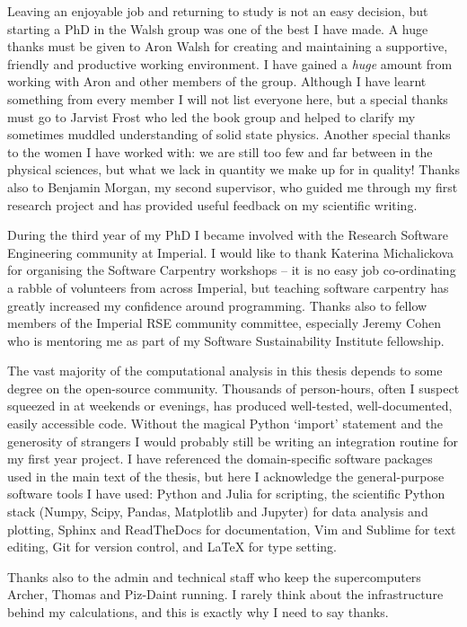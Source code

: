 Leaving an enjoyable job and returning to study is not an easy decision, but starting a PhD in the Walsh group was one of the best I have made. A huge thanks must be given to Aron Walsh for creating and maintaining a supportive, friendly and productive working environment. I have gained a \textit{huge} amount from working with Aron and other members of the group. Although I have learnt something from every member I will not list everyone here, but a special thanks must go to Jarvist Frost who led the book group and helped to clarify my sometimes muddled understanding of solid state physics. Another special thanks to the women I have worked with: we are still too few and far between in the physical sciences, but what we lack in quantity we make up for in quality! Thanks also to Benjamin Morgan, my second supervisor, who guided me through my first research project and has provided useful feedback on my scientific writing. 

During the third year of my PhD I became involved with the Research Software Engineering community at Imperial. I would like to thank Katerina Michalickova for organising the Software Carpentry workshops -- it is no easy job co-ordinating a rabble of volunteers from across Imperial, but teaching software carpentry has greatly increased my confidence around programming. Thanks also to fellow members of the Imperial RSE community committee, especially Jeremy Cohen who is mentoring me as part of my Software Sustainability Institute fellowship.

The vast majority of the computational analysis in this thesis depends to some degree on the open-source community. Thousands of person-hours, often I suspect squeezed in at weekends or evenings, has produced well-tested, well-documented, easily accessible code. Without the magical Python `import' statement and the generosity of strangers I would probably still be writing an integration routine for my first year project. I have referenced the domain-specific software packages used in the main text of the thesis, but here I acknowledge the general-purpose software tools I have used: Python and Julia for scripting, the scientific Python stack (Numpy, Scipy, Pandas, Matplotlib and Jupyter) for data analysis and plotting, Sphinx and ReadTheDocs for documentation, Vim and Sublime for text editing, Git for version control, and LaTeX for type setting.

Thanks also to the admin and technical staff who keep the supercomputers Archer, Thomas and Piz-Daint running. I rarely think about the infrastructure behind my calculations, and this is exactly why I need to say thanks.

